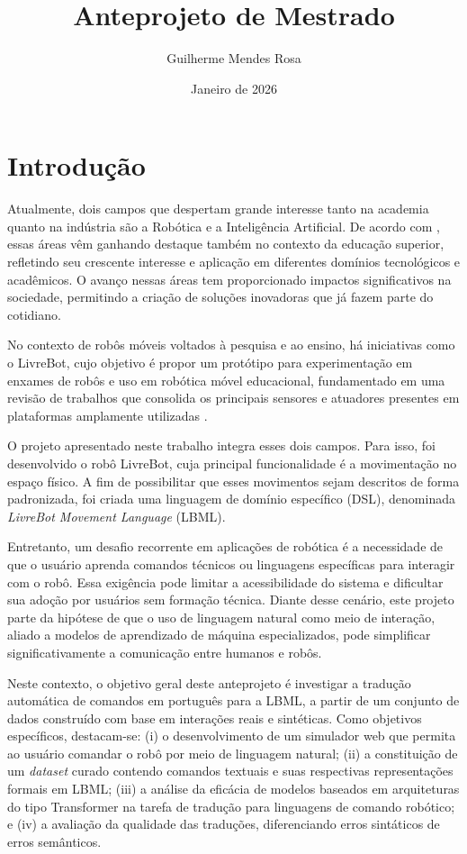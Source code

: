\documentclass{article}
\title{Anteprojeto de Mestrado}
\author{Guilherme Mendes Rosa}
\date{Janeiro de 2026}
\begin{document}
\maketitle

\section{Introdução}

Atualmente, dois campos que despertam grande interesse tanto na academia quanto na indústria são a Robótica e a Inteligência Artificial. De acordo com \citet{Zamora2025Robotics}, essas áreas vêm ganhando destaque também no contexto da educação superior, refletindo seu crescente interesse e aplicação em diferentes domínios tecnológicos e acadêmicos. O avanço nessas áreas tem proporcionado impactos significativos na sociedade, permitindo a criação de soluções inovadoras que já fazem parte do cotidiano.

No contexto de robôs móveis voltados à pesquisa e ao ensino, há iniciativas como o LivreBot, cujo objetivo é propor um protótipo para experimentação em enxames de robôs e uso em robótica móvel educacional, fundamentado em uma revisão de trabalhos que consolida os principais sensores e atuadores presentes em plataformas amplamente utilizadas \citep{Krischanski2025LivreBot}.

O projeto apresentado neste trabalho integra esses dois campos. Para isso, foi desenvolvido o robô LivreBot, cuja principal funcionalidade é a movimentação no espaço físico. A fim de possibilitar que esses movimentos sejam descritos de forma padronizada, foi criada uma linguagem de domínio específico (DSL), denominada \textit{LivreBot Movement Language} (LBML).

Entretanto, um desafio recorrente em aplicações de robótica é a necessidade de que o usuário aprenda comandos técnicos ou linguagens específicas para interagir com o robô. Essa exigência pode limitar a acessibilidade do sistema e dificultar sua adoção por usuários sem formação técnica. Diante desse cenário, este projeto parte da hipótese de que o uso de linguagem natural como meio de interação, aliado a modelos de aprendizado de máquina especializados, pode simplificar significativamente a comunicação entre humanos e robôs.

Neste contexto, o objetivo geral deste anteprojeto é investigar a tradução automática de comandos em português para a LBML, a partir de um conjunto de dados construído com base em interações reais e sintéticas. Como objetivos específicos, destacam-se: (i) o desenvolvimento de um simulador web que permita ao usuário comandar o robô por meio de linguagem natural; (ii) a constituição de um \textit{dataset} curado contendo comandos textuais e suas respectivas representações formais em LBML; (iii) a análise da eficácia de modelos baseados em arquiteturas do tipo Transformer na tarefa de tradução para linguagens de comando robótico; e (iv) a avaliação da qualidade das traduções, diferenciando erros sintáticos de erros semânticos.
\end{document}
